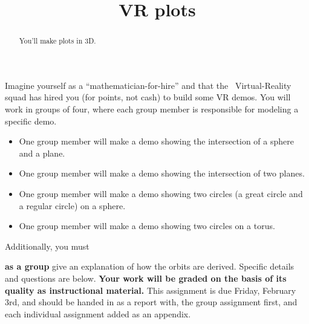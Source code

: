 \documentclass{ximera}
\title{VR plots}
\begin{document}
\begin{abstract}
  You'll make plots in 3D.
\end{abstract}
\maketitle

Imagine yourself as a ``mathematician-for-hire'' and that the
\mooculus\ Virtual-Reality squad has hired you (for points, not cash)
to build some VR demos. You will work in groups of four, where each
group member is responsible for modeling a specific demo.
\begin{itemize}
\item One group member will make a demo showing the intersection of a
  sphere and a plane.
\item One group member will make a demo showing the intersection of
  two planes.
\item One group member will make a demo showing two circles (a great
  circle and a regular circle) on a sphere.
\item One group member will make a demo showing two circles on a
  torus.
\end{itemize}
Additionally, you must


\textbf{as a group} give an explanation of how
the orbits are derived. Specific details and questions are below.
\textbf{Your work will be graded on the basis of its quality as instructional
material.}  This assignment is due Friday, February 3rd, and should be
handed in as a report with, the group assignment first, and each
individual assignment added as an appendix.
\end{document}
